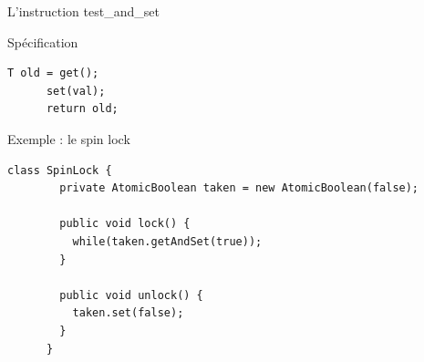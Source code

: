 
\begingroup

\begin{frame}[fragile]{L'instruction test\_and\_set}

  \begin{block}{Spécification}
    \begin{lstlisting}[gobble=6]
      T old = get();
      set(val);
      return old;
    \end{lstlisting}
  \end{block}

  \begin{exampleblock}{Exemple : le spin lock}
    \begin{lstlisting}[gobble=6]
      class SpinLock {
        private AtomicBoolean taken = new AtomicBoolean(false);
        
        public void lock() {
          while(taken.getAndSet(true));
        }
        
        public void unlock() {
          taken.set(false);
        }
      }
    \end{lstlisting}
  \end{exampleblock}

  
\end{frame}

\endgroup
\endinput
